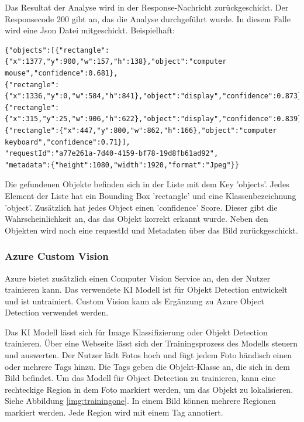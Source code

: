 Das Resultat der Analyse wird in der Response-Nachricht zurückgeschickt. Der Responsecode 200 gibt an, das die Analyse durchgeführt wurde. In diesem Falle wird eine Json Datei mitgeschickt. Beispielhaft:

\begin{lstlisting}
{"objects":[{"rectangle":{"x":1377,"y":900,"w":157,"h":138},"object":"computer mouse","confidence":0.681},
{"rectangle":{"x":1336,"y":0,"w":584,"h":841},"object":"display","confidence":0.873},
{"rectangle":{"x":315,"y":25,"w":906,"h":622},"object":"display","confidence":0.839},
{"rectangle":{"x":447,"y":800,"w":862,"h":166},"object":"computer keyboard","confidence":0.71}],
"requestId":"a77e261a-7d40-4159-bf78-19d8fb61ad92",
"metadata":{"height":1080,"width":1920,"format":"Jpeg"}}
\end{lstlisting}

Die gefundenen Objekte befinden sich in der Liste mit dem Key 'objects'. Jedes Element der Liste hat ein Bounding Box 'rectangle' und eine Klassenbezeichnung 'object'. Zusätzlich hat jedes Object einen 'confidence' Score. Dieser gibt die Wahrscheinlichkeit an, das das Objekt korrekt erkannt wurde. 
Neben den Objekten wird noch eine requestId und Metadaten über das Bild zurückgeschickt.

\subsubsection{Azure Custom Vision}
Azure bietet zusätzlich einen Computer Vision Service an, den der Nutzer trainieren kann. 
Das verwendete KI Modell ist für Objekt Detection entwickelt und ist untrainiert.
Custom Vision kann als Ergänzung zu Azure Object Detection verwendet werden.\citep{Azure302bDoc}

Das KI Modell lässt sich für Image Klassifizierung oder Objekt Detection trainieren. Über eine Webseite lässt sich der Trainingsprozess des Modells steuern und auswerten. Der Nutzer lädt Fotos hoch und fügt jedem Foto händisch einen oder mehrere Tags hinzu. Die Tags geben die Objekt-Klasse an, die sich in dem Bild befindet. Um das Modell für Object Detection zu trainieren, kann eine rechteckige Region in dem Foto markiert werden, um das Objekt zu lokalisieren. Siehe Abbildung \ref{img:trainingone}. In einem Bild können mehrere Regionen markiert werden. Jede Region wird mit einem Tag annotiert.

